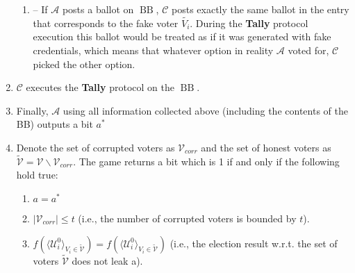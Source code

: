 \documentclass[12pt]{article}
\DeclareMathOperator{\bb}{BB}
\begin{document}
\begin{enumerate}
\begin{enumerate}
\item[] --  If  $\mathcal{A}$ posts a ballot on $\bb$, $\mathcal{C}$ posts exactly the same ballot in the entry that corresponds to the fake voter $\tilde{V_i}$. During the \textbf{Tally} protocol execution this ballot would be treated as if it was generated with fake credentials, which means that whatever option in reality $\mathcal{A}$ voted for, $\mathcal{C}$ picked the other option.  
\end{enumerate}
\item $\mathcal{C}$ executes the \textbf{Tally} protocol on the $\bb$. 
\item Finally, $\mathcal{A}$ using all information collected above (including the contents of the BB) outputs a bit $a^*$
\item Denote the set of corrupted voters as $\mathcal{V}_{corr}$ and the set of honest voters as $\tilde{\mathcal{V}}= \mathcal{V} \backslash \mathcal{V}_{corr}$. The game returns a bit which is 1 if and only if the following hold true:
\begin{enumerate}
 \item $a = a^*$
 \item $|\mathcal{V}_{corr}| \leq t$ (i.e., the number of corrupted voters is bounded by $t$).
  \item $f(\langle \mathcal{U}^0_i \rangle _{V_i \in \tilde{\mathcal{V}}} ) = f(\langle \mathcal{U}^0_i \rangle _{V_i \in \tilde{\mathcal{V}}})$ (i.e., the election result w.r.t. the set of voters  $\tilde{\mathcal{V}}$ does not leak a).
\end{enumerate} 
\end{enumerate}
 
\end{document}
